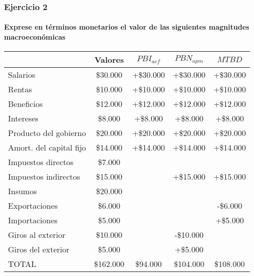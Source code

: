\documentclass[12pt,a4paper]{article}
\newcommand{\consigna}[1]{\paragraph{\indent #1} \hspace{0pt}}
\begin{document}
        
        \newpage
    
    	\subsubsection{Ejercicio 2}
        
        \consigna{Exprese en términos monetarios el valor de las siguientes magnitudes macroeconómicas}
        
        \begin{table}[H]
		\centering
        	\begin{tabular}{ | l | c | c | c | c | }
            \hline
            						& Valores 	& $PBI_{acf}$ & $PBN_{apm}$ & $MTBD$ \\ \hline
            Salarios				& \$30.000	& +\$30.000	& +\$30.000	& +\$30.000 \\ \hline
            Rentas					& \$10.000	& +\$10.000	& +\$10.000	& +\$10.000 \\ \hline
            Beneficios				& \$12.000	& +\$12.000	& +\$12.000	& +\$12.000 \\ \hline
            Intereses				& \$8.000	& +\$8.000	& +\$8.000	& +\$8.000 \\ \hline
            Producto del gobierno	& \$20.000	& +\$20.000	& +\$20.000	& +\$20.000 \\ \hline
            Amort. del capital fijo	& \$14.000	& +\$14.000	& +\$14.000	& +\$14.000 \\ \hline
            Impuestos directos		& \$7.000	&			&			& 			\\ \hline
            Impuestos indirectos	& \$15.000	&			& +\$15.000	& +\$15.000	\\ \hline
            Insumos					& \$20.000	&			&			& 			\\ \hline
            Exportaciones			& \$6.000	&			&			& -\$6.000 \\ \hline
            Importaciones			& \$5.000	&			&			& +\$5.000	\\ \hline
            Giros al exterior		& \$10.000	&			& -\$10.000	& 			\\ \hline
            Giros del exterior		& \$5.000	&			& +\$5.000	& 			\\ \hline
            TOTAL					& \$162.000	& \$94.000	& \$104.000	& \$108.000	\\ \hline
			\end{tabular}
		\end{table}
        
\end{document}
